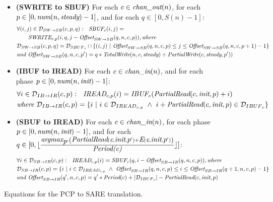 \begin{figure}[ht]
{\begin{minipage}{6.3in}
\begin{itemize}
\begin{align}
\end{align}
%
\item {\bf(SWRITE to SBUF)} For each $c \in \mbox{\it chan\_out}(n)$, for each $p \in [0,
\mbox{\it num}(n, \mbox{\it steady})-1]$, and for each $q \in [0,S(n)-1]$:
\begin{align}
\label{swrite2sbuf}
&\forall (i,j) \in {\cal D}_{SW \rightarrow SB}(c,p,q):~~
\mbox{\it SBUF}_{c}(i,j) = \nonumber\\
&~~~~~~\mbox{\it SWRITE}_{c, p}(i, q,
                     j - \mbox{\it Offset}_{SW \rightarrow SB}(q,n,c,p)),
\mbox{\it where } \\&{\cal D}_{SW \rightarrow SB}(c,p,q) = 
  {\cal D}_{{SBUF}_{c}} \cap 
  \{ (i,j)~|~\mbox{\it Offset}_{SW \rightarrow SB}(q,n,c,p) \le j
             \le \mbox{\it Offset}_{SW \rightarrow SB}(q,n,c,p+1) - 1 \} \nonumber\\\nonumber
&\mbox{\it and } \mbox{\it Offset}_{SW \rightarrow SB}(q,n,c,p') = q*\mbox{\it TotalWrite}(n,c,\mbox{\it steady}) + \mbox{\it PartialWrite}(c,\mbox{\it steady},p'))
\end{align}
%
\item {\bf(IBUF to IREAD)} For each $c \in \mbox{\it chan\_in}(n)$, and for each phase $p \in
[0, \mbox{\it num}(n, \mbox{\it init})-1]$:
\begin{align}
\label{ibuf2iread}
&\forall i \in {\cal D}_{IB \rightarrow IR}(c,p):~~
\mbox{\it IREAD}_{c, p}(i) = \mbox{\it IBUF}_{c}(\mbox{\it PartialRead}(c, \mbox{\it init}, p) + i) \\ \nonumber
&\mbox{\it where }{\cal D}_{IB \rightarrow IR}(c,p) = 
  \{ i~|~i \in {\cal D}_{{IREAD}_{c,p}} ~\wedge~ 
         i + \mbox{\it PartialRead}(c, \mbox{\it init}, p) \in {\cal D}_{{IBUF}_{c}} \}
\end{align}
%
\item {\bf(SBUF to IREAD)} For each $c \in \mbox{\it chan\_in}(n)$, for each phase $p \in [0,
\mbox{\it num}(n, \mbox{\it init})-1]$, and for each \\$q \in [0, \lfloor
\frac{\mbox{\it argmax}_{\mbox{\it p}'} \left( \mbox{\it PartialRead}(\mbox{\it c}, \mbox{\it init},
\mbox{\it p}') + \mbox{\it E}(\mbox{\it c}, \mbox{\it init}, \mbox{\it p}') \right)
}{\mbox{\it Period(c)}} \rfloor ]$:
\begin{align}
\label{sbuf2iread}
&\forall i \in {\cal D}_{SB \rightarrow IR}(c,p):~~ 
\mbox{\it IREAD}_{c,p}(i) = 
    \mbox{\it SBUF}_{c}(q,
      i - \mbox{\it Offset}_{SB \rightarrow IR}(q,n,c,p)), \mbox{\it where } \\ \nonumber
&{\cal D}_{SB \rightarrow IR}(c,p) = 
  \{ i~|~i \in {\cal D}_{{IREAD}_{c,p}} ~\wedge~
         \mbox{\it Offset}_{SB \rightarrow IR}(q,n,c,p)
         \le i \le
         \mbox{\it Offset}_{SB \rightarrow IR}(q+1,n,c,p) - 1 \} \\ \nonumber
&\mbox{\it and }\mbox{\it Offset}_{SB \rightarrow IR}(q',n,c,p) = 
  q' * \mbox{\it Period}(c) + |{\cal D}_{{IBUF}_c}| - \mbox{\it PartialRead}(c,\mbox{\it init},p)
\end{align}
%
\end{itemize}
\end{minipage}}
\caption{Equations for the PCP to SARE translation.
\protect\label{fig:pcptosare2}}
\end{figure}

